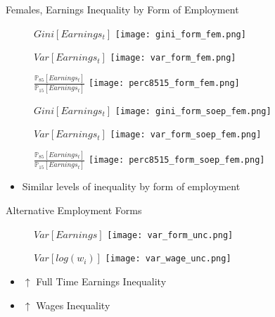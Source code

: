 \documentclass{beamer}
\begin{document}
\begin{frame}{Females, Earnings Inequality by Form of Employment}
\begin{figure}[!t]
\centering
\begin{minipage}[b]{0.32\textwidth}{$Gini[Earnings_t]$}
\centering
\texttt{[image: gini\_form\_fem.png]}
\end{minipage}
\begin{minipage}[b]{0.32\textwidth}{$Var[Earnings_t]$}
\centering
\texttt{[image: var\_form\_fem.png]}
\end{minipage}
\begin{minipage}[b]{0.32\textwidth}{$\frac{\mathbb{P}_{85}[Earnings_t]}{\mathbb{P}_{15}[Earnings_t]}$}
\centering
\texttt{[image: perc8515\_form\_fem.png]}
\end{minipage}
\end{figure}
\begin{figure}[!t]
\centering
\begin{minipage}[b]{0.32\textwidth}{$Gini[Earnings_t]$}
\centering
\texttt{[image: gini\_form\_soep\_fem.png]}
\end{minipage}
\begin{minipage}[b]{0.32\textwidth}{$Var[Earnings_t]$}
\centering
\texttt{[image: var\_form\_soep\_fem.png]}
\end{minipage}
\begin{minipage}[b]{0.32\textwidth}{$\frac{\mathbb{P}_{85}[Earnings_t]}{\mathbb{P}_{15}[Earnings_t]}$}
\centering
\texttt{[image: perc8515\_form\_soep\_fem.png]}
\end{minipage}
\end{figure}
\begin{itemize}
\setlength{\itemsep}{0.7 cm}
\item Similar levels of inequality by form of employment
\end{itemize}
\end{frame}


\begin{frame}{Alternative Employment Forms}
\begin{figure}[!t]
\centering
\begin{minipage}[b]{0.48\textwidth}{$Var[Earnings]$}
\centering
\texttt{[image: var\_form\_unc.png]}
\end{minipage}
\begin{minipage}[b]{0.48\textwidth}{$Var[log(w_i)]$}
\centering
\texttt{[image: var\_wage\_unc.png]}
\end{minipage}
\end{figure}
\begin{itemize}
\setlength{\itemsep}{0.7 cm}
\item $\uparrow$ Full Time Earnings Inequality
\item $\uparrow$ Wages Inequality
\end{itemize}
\end{frame}
\end{document}
